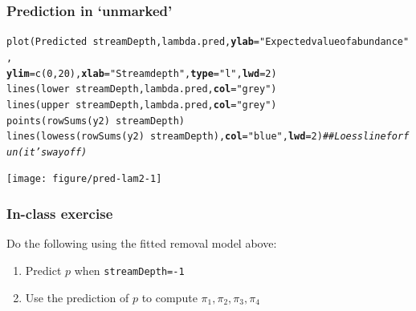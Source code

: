 \documentclass[color=usenames,dvipsnames]{beamer}\usepackage[]{graphicx}\usepackage[]{color}
\makeatletter
\newcommand{\hlnum}[1]{\textcolor[rgb]{0.69,0.494,0}{#1}}%
\newcommand{\hlstr}[1]{\textcolor[rgb]{0.749,0.012,0.012}{#1}}%
\newcommand{\hlcom}[1]{\textcolor[rgb]{0.514,0.506,0.514}{\textit{#1}}}%
\newcommand{\hlopt}[1]{\textcolor[rgb]{0,0,0}{#1}}%
\newcommand{\hlstd}[1]{\textcolor[rgb]{0,0,0}{#1}}%
\newcommand{\hlkwc}[1]{\textcolor[rgb]{0,0,0}{\textbf{#1}}}%
\newcommand{\hlkwd}[1]{\textcolor[rgb]{0.004,0.004,0.506}{#1}}%
\newenvironment{kframe}{%
 \def\at@end@of@kframe{}%
 \ifinner\ifhmode%
  \def\at@end@of@kframe{\end{minipage}}%
  \begin{minipage}{\columnwidth}%
 \fi\fi%
 \def\FrameCommand##1{\hskip\@totalleftmargin \hskip-\fboxsep
 \colorbox{shadecolor}{##1}\hskip-\fboxsep
     \hskip-\linewidth \hskip-\@totalleftmargin \hskip\columnwidth}%
 \MakeFramed {\advance\hsize-\width
   \@totalleftmargin\z@ \linewidth\hsize
   \@setminipage}}%
 {\par\unskip\endMakeFramed%
 \at@end@of@kframe}
\newenvironment{knitrout}{}{} %
\makeatother
\begin{document}
\begin{frame}[fragile]
  \frametitle{Prediction in `unmarked'}
\begin{knitrout}\tiny
{}\color{fgcolor}\begin{kframe}
\begin{alltt}
\hlkwd{plot}\hlstd{(Predicted} \hlopt{~} \hlstd{streamDepth, lambda.pred,} \hlkwc{ylab}\hlstd{=}\hlstr{"Expected value of abundance"}\hlstd{,}
     \hlkwc{ylim}\hlstd{=}\hlkwd{c}\hlstd{(}\hlnum{0}\hlstd{,}\hlnum{20}\hlstd{),} \hlkwc{xlab}\hlstd{=}\hlstr{"Stream depth"}\hlstd{,} \hlkwc{type}\hlstd{=}\hlstr{"l"}\hlstd{,} \hlkwc{lwd}\hlstd{=}\hlnum{2}\hlstd{)}
\hlkwd{lines}\hlstd{(lower} \hlopt{~} \hlstd{streamDepth, lambda.pred,} \hlkwc{col}\hlstd{=}\hlstr{"grey"}\hlstd{)}
\hlkwd{lines}\hlstd{(upper} \hlopt{~} \hlstd{streamDepth, lambda.pred,} \hlkwc{col}\hlstd{=}\hlstr{"grey"}\hlstd{)}
\hlkwd{points}\hlstd{(}\hlkwd{rowSums}\hlstd{(y2)}\hlopt{~}\hlstd{streamDepth)}
\hlkwd{lines}\hlstd{(}\hlkwd{lowess}\hlstd{(}\hlkwd{rowSums}\hlstd{(y2)}\hlopt{~}\hlstd{streamDepth),} \hlkwc{col}\hlstd{=}\hlstr{"blue"}\hlstd{,} \hlkwc{lwd}\hlstd{=}\hlnum{2}\hlstd{)}  \hlcom{## Loess line for fun (it's way off)}
\end{alltt}
\end{kframe}

{\centering \texttt{[image: figure/pred-lam2-1]} 

}


\end{knitrout}
\end{frame}







\begin{frame}[fragile]
  \frametitle{In-class exercise}
  Do the following using the fitted removal model above:
  \begin{enumerate}
    \normalsize
    \item Predict $p$ when \verb+streamDepth=-1+
    \item Use the prediction of $p$ to compute $\pi_1, \pi_2, \pi_3, \pi_4$
  \end{enumerate}
\end{frame}
\end{document}
